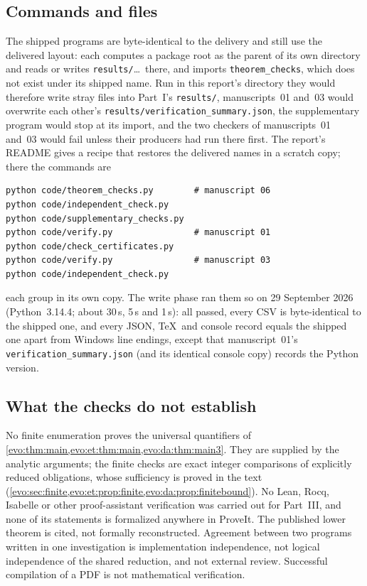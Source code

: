 \documentclass[11pt,a4paper]{article}
\numberwithin{equation}{section}
\theoremstyle{definition}
\theoremstyle{remark}
\begin{document}
\subsection{Commands and files}\label{evo:sec:commands}

The shipped programs are byte-identical to the delivery and still use the
delivered layout: each computes a package root as the parent of its own
directory and reads or writes \texttt{results/}\ldots\ there, and
 imports
\texttt{theorem\_checks}, which does not exist under its shipped name. Run in
this report's directory they would therefore write stray files into Part~I's
\texttt{results/}, manuscripts~01 and~03 would overwrite each other's
\texttt{results/verification\_summary.json}, the supplementary program would
stop at its import, and the two checkers of manuscripts~01 and~03 would fail
unless their producers had run there first. The report's README gives a recipe that restores the delivered names in
a scratch copy; there the commands are
\begin{lstlisting}
python code/theorem_checks.py        # manuscript 06
python code/independent_check.py
python code/supplementary_checks.py
python code/verify.py                # manuscript 01
python code/check_certificates.py
python code/verify.py                # manuscript 03
python code/independent_check.py
\end{lstlisting}
each group in its own copy. The write phase ran them so on 29 September 2026
(Python~3.14.4; about 30\,s, 5\,s and 1\,s): all passed, every CSV is
byte-identical to the shipped one, and every JSON, \TeX\ and console record
equals the shipped one apart from Windows line endings, except that
manuscript~01's \texttt{verification\_summary.json} (and its identical
console copy) records the Python version.

\subsection{What the checks do not establish}

No finite enumeration proves the universal quantifiers of
\cref{evo:thm:main,evo:et:thm:main,evo:da:thm:main3}. They are supplied by
the analytic arguments; the finite checks are exact integer comparisons of
explicitly reduced obligations, whose sufficiency is proved in the text
(\cref{evo:sec:finite,evo:et:prop:finite,evo:da:prop:finitebound}). No Lean,
Rocq, Isabelle or other proof-assistant verification was carried out for
Part~III, and none of its statements is formalized anywhere in ProveIt. The
published lower theorem is cited, not formally reconstructed. Agreement
between two programs written in one investigation is implementation
independence, not logical independence of the shared reduction, and not
external review. Successful compilation of a PDF is not mathematical
verification.
\end{document}
